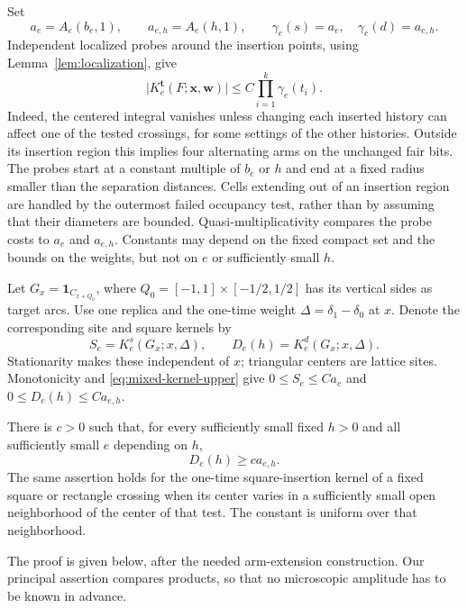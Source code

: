 Set
\[
 a_e=A_e(b_e,1),\qquad a_{e,h}=A_e(h,1),\qquad
 \gamma_e(s)=a_e,\quad \gamma_e(d)=a_{e,h}.
\]
Independent localized probes around the insertion points, using
Lemma~\ref{lem:localization}, give
\begin{equation}
 \bigl|K_e^{\boldsymbol t}(F;\boldsymbol x,\boldsymbol w)\bigr|
 \leq C\prod_{i=1}^k \gamma_e(t_i).
 \label{eq:mixed-kernel-upper}
\end{equation}
Indeed, the centered integral vanishes unless changing each inserted
history can affect one of the tested crossings, for some settings of the
other histories.  Outside its insertion region this implies four
alternating arms on the unchanged fair bits.  The probes start at a
constant multiple of $b_e$ or $h$ and end at a fixed radius smaller than
the separation distances.  Cells extending out of an insertion region
are handled by the outermost failed occupancy test, rather than by assuming
that their diameters are bounded.  Quasi-multiplicativity compares the
probe costs to $a_e$ and $a_{e,h}$.  Constants may depend on the fixed
compact set and the bounds on the weights, but not on $e$ or sufficiently
small $h$.

Let $G_x=\mathbf1_{C_{x+Q_0}}$, where
$Q_0=[-1,1]\times[-1/2,1/2]$ has its vertical sides as target arcs.
Use one replica and the one-time weight
$\Delta=\delta_1-\delta_0$ at $x$.  Denote the corresponding site and
square kernels by
\[
 S_e=K_e^s(G_x;x,\Delta),\qquad
 D_e(h)=K_e^d(G_x;x,\Delta).
\]
Stationarity makes these independent of $x$; triangular centers are lattice
sites.  Monotonicity and \eqref{eq:mixed-kernel-upper} give
$0\leq S_e\leq C a_e$ and $0\leq D_e(h)\leq C a_{e,h}$.

\begin{lemma}
\label{lem:disk-lower}
There is $c>0$ such that, for every sufficiently small fixed $h>0$ and all
sufficiently small $e$ depending on $h$,
\begin{equation}
 D_e(h)\geq c a_{e,h}.
 \label{eq:disk-lower}
\end{equation}
The same assertion holds for the one-time square-insertion kernel of a
fixed square or rectangle crossing when its center varies in a sufficiently
small open neighborhood of the center of that test.  The constant is
uniform over that neighborhood.
\end{lemma}

The proof is given below, after the needed arm-extension construction.
Our principal assertion compares products, so that no microscopic
amplitude has to be known in advance.

